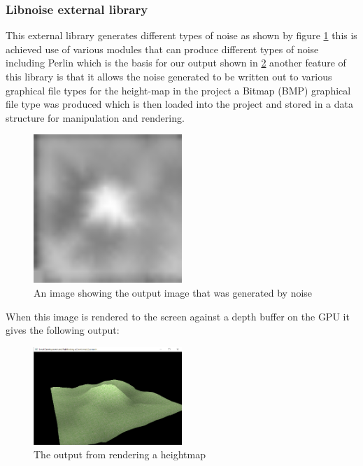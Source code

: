 \documentclass[12pt,a4paper]{article}
\begin{document}
\subsubsection{Libnoise external library}
This external library generates different types of noise as shown by figure \ref{noise} this is achieved use of various modules that can produce different types of noise including Perlin which is the basis for our output shown in \ref{heightmap} another feature of this library is that it allows the noise generated to be written out to various graphical file types for the height-map in the project a Bitmap (BMP) graphical file type was produced which is then loaded into the project and stored in a data structure for manipulation and rendering.\\
\begin{figure}[ht!]
	\includegraphics[width=0.5\textwidth]{images/heightmaptest}
	\caption{An image showing the output image that was generated by noise}	 \label{noise}
\end{figure}

\pagebreak
When this image is rendered to the screen against a depth buffer on the GPU it gives the following output:
\begin{figure}[ht!]
	\includegraphics[width=0.5\textwidth]{images/Heightmap-output}
	\caption{The output from rendering a heightmap} \label{heightmap}
\end{figure}
\end{document}
